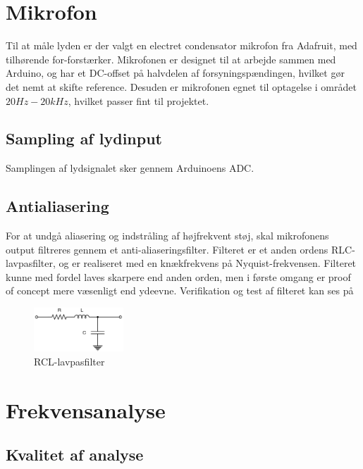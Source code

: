 \section{Mikrofon}
Til at måle lyden er der valgt en electret condensator mikrofon fra Adafruit, med tilhørende for-forstærker. %
Mikrofonen er designet til at arbejde sammen med Arduino, og har et DC-offset på halvdelen af forsyningspændingen, hvilket gør det nemt at skifte reference. 
Desuden er mikrofonen egnet til optagelse i området $20 Hz - 20 kHz$, hvilket passer fint til projektet. 

\subsection{Sampling af lydinput}
Samplingen af lydsignalet sker gennem Arduinoens ADC. 



\subsection{Antialiasering}
For at undgå aliasering og indstråling af højfrekvent støj, skal mikrofonens output filtreres gennem et anti-aliaseringsfilter.
Filteret er et anden ordens RLC-lavpasfilter, og er realiseret med en knækfrekvens på Nyquist-frekvensen. 
Filteret kunne med fordel laves skarpere end anden orden, men i første omgang er proof of concept mere væsenligt end ydeevne. 
Verifikation og test af filteret kan ses på %

\begin{figure}[H]
	\center
	\includegraphics[width=0.3\textwidth]{Figur/RCL_diagram.pdf}
	\caption{RCL-lavpasfilter}
	\label{fig:RCL}
\end{figure}

\section{Frekvensanalyse}



\subsection{Kvalitet af analyse}